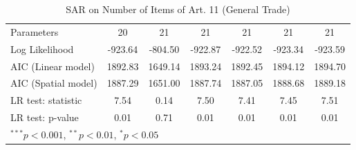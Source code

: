 \begin{table}[!h]
\begin{center}
\begin{tabular}{l c c c c c c }
Parameters              & 20           & 21           & 21           & 21           & 21           & 21           \\
Log Likelihood          & -923.64      & -804.50      & -922.87      & -922.52      & -923.34      & -923.59      \\
AIC (Linear model)      & 1892.83      & 1649.14      & 1893.24      & 1892.45      & 1894.12      & 1894.70      \\
AIC (Spatial model)     & 1887.29      & 1651.00      & 1887.74      & 1887.05      & 1888.68      & 1889.18      \\
LR test: statistic      & 7.54         & 0.14         & 7.50         & 7.41         & 7.45         & 7.51         \\
LR test: p-value        & 0.01         & 0.71         & 0.01         & 0.01         & 0.01         & 0.01         \\
\bottomrule
\multicolumn{7}{l}{\scriptsize{$^{***}p<0.001$, $^{**}p<0.01$, $^*p<0.05$}}
\end{tabular}
\caption{SAR on Number of Items of Art. 11 (General Trade)}
\label{table:coefficients}
\end{center}
\end{table}
